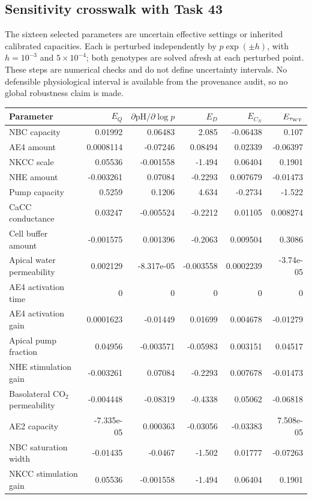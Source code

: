 \subsection{Sensitivity crosswalk with Task 43}
The sixteen selected parameters are uncertain effective settings or inherited calibrated capacities. Each is perturbed independently by $p\exp(\pm h)$, with $h=10^{-3}$ and $5\times10^{-4}$; both genotypes are solved afresh at each perturbed point. These steps are numerical checks and do not define uncertainty intervals. No defensible physiological interval is available from the provenance audit, so no global robustness claim is made.
\begin{center}\small
\begin{tabular}{lrrrrr}\hline
Parameter & $E_Q$ & $\partial\mathrm{pH}/\partial\log p$ & $E_D$ & $E_{C_N}$ & $E_{\tau_{\rm WT}}$\\\hline
NBC capacity & 0.01992 & 0.06483 & 2.085 & -0.06438 & 0.107\\
AE4 amount & 0.0008114 & -0.07246 & 0.08494 & 0.02339 & -0.06397\\
NKCC scale & 0.05536 & -0.001558 & -1.494 & 0.06404 & 0.1901\\
NHE amount & -0.003261 & 0.07084 & -0.2293 & 0.007679 & -0.01473\\
Pump capacity & 0.5259 & 0.1206 & 4.634 & -0.2734 & -1.522\\
CaCC conductance & 0.03247 & -0.005524 & -0.2212 & 0.01105 & 0.008274\\
Cell buffer amount & -0.001575 & 0.001396 & -0.2063 & 0.009504 & 0.3086\\
Apical water permeability & 0.002129 & -8.317e-05 & -0.003558 & 0.0002239 & -3.74e-05\\
AE4 activation time & 0 & 0 & 0 & 0 & 0\\
AE4 activation gain & 0.0001623 & -0.01449 & 0.01699 & 0.004678 & -0.01279\\
Apical pump fraction & 0.04956 & -0.003571 & -0.05983 & 0.003151 & 0.04517\\
NHE stimulation gain & -0.003261 & 0.07084 & -0.2293 & 0.007678 & -0.01473\\
Basolateral CO$_2$ permeability & -0.004448 & -0.08319 & -0.4338 & 0.05062 & -0.06818\\
AE2 capacity & -7.335e-05 & 0.000363 & -0.03056 & -0.03383 & 7.508e-05\\
NBC saturation width & -0.01435 & -0.0467 & -1.502 & 0.01777 & -0.07263\\
NKCC stimulation gain & 0.05536 & -0.001558 & -1.494 & 0.06404 & 0.1901\\
\hline\end{tabular}\end{center}
